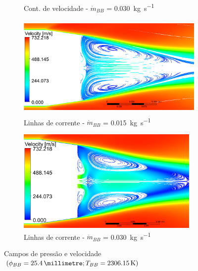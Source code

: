 \begin{figure}[!ht]
\begin{subfigure}[b]{0.47\textwidth}
        \caption{Cont. de velocidade - \(\Dot{m}_{BB}\) = \qty{0,030}{\kilogram\per\second}}
        \label{fig:contorno-velocidade-bb-1pol-vazao0030}
    \end{subfigure}
    \hfill
    \begin{subfigure}[b]{0.47\textwidth} %
        \centering
        \includegraphics[height=5cm,width=\textwidth]{corrente-velocidade-2306K-vazao-0015-1pol.png}
        \caption{Linhas de corrente - \(\Dot{m}_{BB}\) = \qty{0,015}{\kilogram\per\second}}
        \label{fig:corrente-velocidade-bb-1pol-vazao0015}
    \end{subfigure}
    \hfill
    \begin{subfigure}[b]{0.47\textwidth} %
        \centering
        \includegraphics[height=5cm,width=\textwidth]{corrente-velocidade-2306K-vazao-0030-1pol.png}
        \caption{Linhas de corrente - \(\Dot{m}_{BB}\) = \qty{0,030}{\kilogram\per\second}}
        \label{fig:corrente-velocidade-bb-1pol-vazao0030}
    \end{subfigure}
    \caption{Campos de pressão e velocidade \(\left(\phi_{BB} = \qty{25,4}{\millimetre}; T_{BB} = \qty{2306,15}{\kelvin}\right)\)}
	\label{fig:influencia-diametro-vazao-1pol}
\end{figure}


